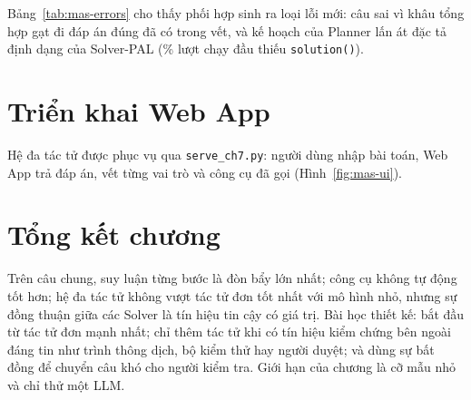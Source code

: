 

Bảng~\ref{tab:mas-errors} cho thấy phối hợp sinh ra loại lỗi mới:  câu sai vì khâu tổng hợp gạt đi đáp án đúng đã có trong vết, và kế hoạch của Planner lấn át đặc tả định dạng của Solver-PAL (\% lượt chạy đầu thiếu \texttt{solution()}).

\section{Triển khai Web App}\label{sec:mas-deploy}
Hệ đa tác tử được phục vụ qua \texttt{serve\_ch7.py}: người dùng nhập bài toán, Web App trả đáp án, vết từng vai trò và công cụ đã gọi (Hình~\ref{fig:mas-ui}).


\section{Tổng kết chương}
Trên  câu chung, suy luận từng bước là đòn bẩy lớn nhất; công cụ không tự động tốt hơn; hệ đa tác tử không vượt tác tử đơn tốt nhất với mô hình nhỏ, nhưng sự đồng thuận giữa các Solver là tín hiệu tin cậy có giá trị. Bài học thiết kế: bắt đầu từ tác tử đơn mạnh nhất; chỉ thêm tác tử khi có tín hiệu kiểm chứng bên ngoài đáng tin như trình thông dịch, bộ kiểm thử hay người duyệt; và dùng sự bất đồng để chuyển câu khó cho người kiểm tra. Giới hạn của chương là cỡ mẫu nhỏ và chỉ thử một LLM.

